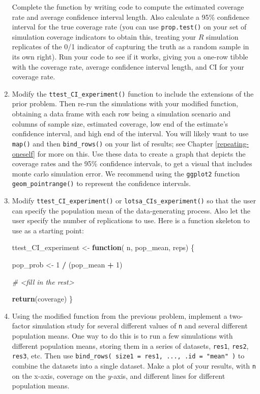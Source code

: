 \documentclass[
]{book}
\newenvironment{Shaded}{\begin{snugshade}}{\end{snugshade}}
\newcommand{\CommentTok}[1]{\textcolor[rgb]{0.56,0.35,0.01}{\textit{#1}}}
\newcommand{\ControlFlowTok}[1]{\textcolor[rgb]{0.13,0.29,0.53}{\textbf{#1}}}
\newcommand{\DecValTok}[1]{\textcolor[rgb]{0.00,0.00,0.81}{#1}}
\newcommand{\FunctionTok}[1]{\textcolor[rgb]{0.13,0.29,0.53}{\textbf{#1}}}
\newcommand{\NormalTok}[1]{#1}
\newcommand{\OtherTok}[1]{\textcolor[rgb]{0.56,0.35,0.01}{#1}}
\newcommand{\SpecialCharTok}[1]{\textcolor[rgb]{0.81,0.36,0.00}{\textbf{#1}}}
\begin{document}
\begin{enumerate}
  Complete the function by writing code to compute the estimated coverage rate and average confidence interval length. Also calculate a 95\% confidence interval for the true coverage rate (you can use \texttt{prop.test()} on your set of simulation coverage indicators to obtain this, treating your \(R\) simulation replicates of the 0/1 indicator of capturing the truth as a random sample in its own right). Run your code to see if it works, giving you a one-row tibble with the coverage rate, average confidence interval length, and CI for your coverage rate.
\item
  Modify the \texttt{ttest\_CI\_experiment()} function to include the extensions of the prior problem. Then re-run the simulations with your modified function, obtaining a data frame with each row being a simulation scenario and columns of sample size, estimated coverage, low end of the estimate's confidence interval, and high end of the interval. You will likely want to use \texttt{map()} and then \texttt{bind\_rows()} on your list of results; see Chapter \ref{repeating-oneself} for more on this.
  Use these data to create a graph that depicts the coverage rates and the 95\% confidence intervals, to get a visual that includes monte carlo simulation error.
  We recommend using the \texttt{ggplot2} function \texttt{geom\_pointrange()} to represent the confidence intervals.
\item
  Modify \texttt{ttest\_CI\_experiment()} or \texttt{lotsa\_CIs\_experiment()} so that the user can specify the population mean of the data-generating process. Also let the user specify the number of replications to use. Here is a function skeleton to use as a starting point:

\begin{Shaded}
\begin{Highlighting}[]
\NormalTok{ttest\_CI\_experiment }\OtherTok{\textless{}{-}} \ControlFlowTok{function}\NormalTok{( n, pop\_mean, reps) \{}

\NormalTok{  pop\_prob }\OtherTok{\textless{}{-}} \DecValTok{1} \SpecialCharTok{/}\NormalTok{ (pop\_mean }\SpecialCharTok{+} \DecValTok{1}\NormalTok{)}

  \CommentTok{\# \textless{}fill in the rest\textgreater{}}

  \FunctionTok{return}\NormalTok{(coverage)}
\NormalTok{\}}
\end{Highlighting}
\end{Shaded}
\item
  Using the modified function from the previous problem, implement a two-factor simulation study for several different values of \texttt{n} and several different population means.
  One way to do this is to run a few simulations with different population means, storing them in a series of datasets, \texttt{res1}, \texttt{res2}, \texttt{res3}, etc.
  Then use \texttt{bind\_rows(\ size1\ =\ res1,\ ...,\ .id\ =\ "mean"\ )} to combine the datasets into a single dataset.
  Make a plot of your results, with \texttt{n} on the x-axis, coverage on the \(y\)-axis, and different lines for different population means.
\end{enumerate}
\end{document}
